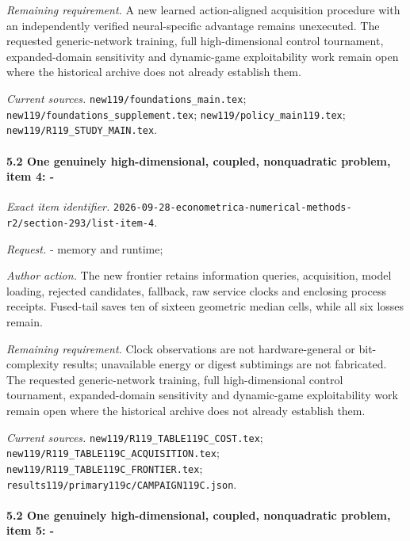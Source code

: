 \par\emph{Remaining requirement.} A new learned action-aligned acquisition procedure with an independently verified neural-specific advantage remains unexecuted. The requested generic-network training, full high-dimensional control tournament, expanded-domain sensitivity and dynamic-game exploitability work remain open where the historical archive does not already establish them.

\par\emph{Current sources.} \nolinkurl{new119/foundations_main.tex}; \nolinkurl{new119/foundations_supplement.tex}; \nolinkurl{new119/policy_main119.tex}; \nolinkurl{new119/R119_STUDY_MAIN.tex}.

\paragraph{5.2 One genuinely high-dimensional, coupled, nonquadratic problem, item 4: -}

\emph{Exact item identifier.} \nolinkurl{2026-09-28-econometrica-numerical-methods-r2/section-293/list-item-4}.

\par\emph{Request.} - memory and runtime;

\par\emph{Author action.} The new frontier retains information queries, acquisition, model loading, rejected candidates, fallback, raw service clocks and enclosing process receipts. Fused-tail saves ten of sixteen geometric median cells, while all six losses remain.

\par\emph{Remaining requirement.} Clock observations are not hardware-general or bit-complexity results; unavailable energy or digest subtimings are not fabricated. The requested generic-network training, full high-dimensional control tournament, expanded-domain sensitivity and dynamic-game exploitability work remain open where the historical archive does not already establish them.

\par\emph{Current sources.} \nolinkurl{new119/R119_TABLE119C_COST.tex}; \nolinkurl{new119/R119_TABLE119C_ACQUISITION.tex}; \nolinkurl{new119/R119_TABLE119C_FRONTIER.tex}; \nolinkurl{results119/primary119c/CAMPAIGN119C.json}.

\paragraph{5.2 One genuinely high-dimensional, coupled, nonquadratic problem, item 5: -}


